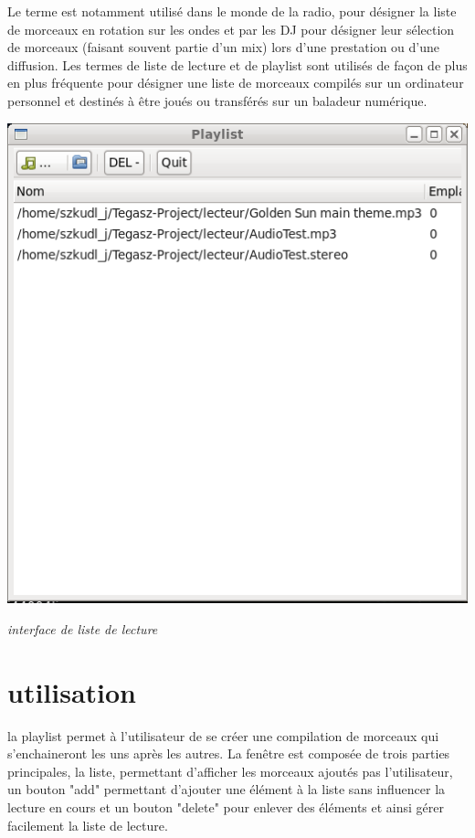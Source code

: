 \documentclass[12pt,a4paper]{report}
\begin{document}
Le terme est notamment utilisé dans le monde de la radio, pour désigner la liste de morceaux en rotation sur les ondes et par les DJ pour désigner leur sélection de morceaux (faisant souvent partie d'un mix) lors d'une prestation ou d'une diffusion.
Les termes de liste de lecture et de playlist sont utilisés de façon de plus en plus fréquente pour désigner une liste de morceaux compilés sur un ordinateur personnel et destinés à être joués ou transférés sur un baladeur numérique.


\begin{center}
\includegraphics[scale=0.5]{playlist.png}

\it{interface de liste de lecture}
\end{center}

\section{utilisation}
la playlist permet à l'utilisateur de se créer une compilation de morceaux qui s'enchaineront les uns après les autres. La fenêtre est composée de trois parties principales, la liste, permettant d'afficher les morceaux ajoutés pas l'utilisateur, un bouton "add" permettant d'ajouter une élément à la liste sans influencer la lecture en cours et un bouton "delete" pour enlever des éléments et ainsi gérer facilement la liste de lecture.
\end{document}
